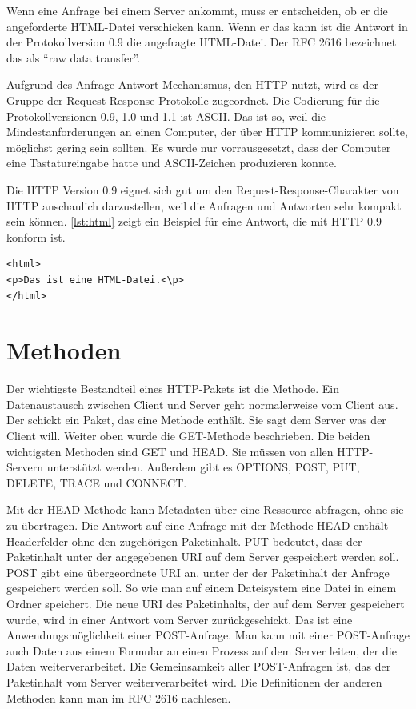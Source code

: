 \documentclass{llncs}
\begin{document}
Wenn eine Anfrage bei einem Server ankommt, muss er entscheiden, ob er die angeforderte HTML-Datei verschicken kann. Wenn er das kann ist die Antwort in der Protokollversion 0.9 die angefragte HTML-Datei. Der RFC 2616 bezeichnet das als ``raw data transfer''.

Aufgrund des Anfrage-Antwort-Mechanismus, den HTTP nutzt, wird es der Gruppe der Request-Response-Protokolle zugeordnet. Die Codierung für die Protokollversionen 0.9, 1.0 und 1.1 ist ASCII. Das ist so, weil die Mindestanforderungen an einen Computer, der über HTTP kommunizieren sollte, möglichst gering sein sollten. Es wurde nur vorrausgesetzt, dass der Computer eine Tastatureingabe hatte und ASCII-Zeichen produzieren konnte. \cite{Berners-Lee1999}

Die HTTP Version 0.9 eignet sich gut um den Request-Response-Charakter von HTTP anschaulich darzustellen, weil die Anfragen und Antworten sehr kompakt sein können. \ref{lst:html} zeigt ein Beispiel für eine Antwort, die mit HTTP 0.9 konform ist.

\lstset{ 
  xleftmargin=.2\textwidth, xrightmargin=.2\textwidth,
  basicstyle=\ttfamily
}
\begin{lstlisting}[caption={Antwort-Paket nach HTTP 0.9},label={lst:html}]
<html>
<p>Das ist eine HTML-Datei.<\p>
</html>
\end{lstlisting}

\section{Methoden}
Der wichtigste Bestandteil eines HTTP-Pakets ist die Methode. Ein Datenaustausch zwischen Client und Server geht normalerweise vom Client aus. Der schickt ein Paket, das eine Methode enthält. Sie sagt dem Server was der Client will. Weiter oben wurde die GET-Methode beschrieben. Die beiden wichtigsten Methoden sind GET und HEAD. Sie müssen von allen HTTP-Servern unterstützt werden. \cite{Fielding1999} Außerdem gibt es OPTIONS, POST, PUT, DELETE, TRACE und CONNECT. 

Mit der HEAD Methode kann Metadaten über eine Ressource abfragen, ohne sie zu übertragen. Die Antwort auf eine Anfrage mit der Methode HEAD enthält Headerfelder ohne den zugehörigen Paketinhalt.  PUT bedeutet, dass der Paketinhalt unter der angegebenen URI auf dem Server gespeichert werden soll. POST gibt eine übergeordnete URI an, unter der der Paketinhalt der Anfrage gespeichert werden soll. So wie man auf einem Dateisystem eine Datei in einem Ordner speichert. Die neue URI des Paketinhalts, der auf dem Server gespeichert wurde, wird in einer Antwort vom Server zurückgeschickt. Das ist eine Anwendungsmöglichkeit einer POST-Anfrage. Man kann mit einer POST-Anfrage auch Daten aus einem Formular an einen Prozess auf dem Server leiten, der die Daten weiterverarbeitet.
Die Gemeinsamkeit aller POST-Anfragen ist, das der Paketinhalt vom Server weiterverarbeitet wird. Die Definitionen der anderen Methoden kann man im RFC 2616 nachlesen.
\end{document}
